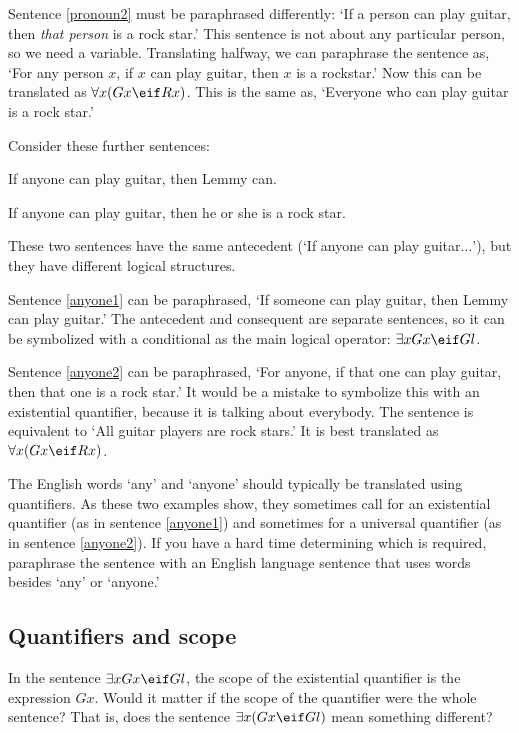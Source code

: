 Sentence \ref{pronoun2} must be paraphrased differently: `If a person can play guitar, then \emph{that person} is a rock star.' This sentence is not about any particular person, so we need a variable. Translating halfway, we can paraphrase the sentence as, `For any person $x$, if $x$ can play guitar, then $x$ is a rockstar.' Now this can be translated as $\forall x (Gx \eif Rx)$. This is the same as, `Everyone who can play guitar is a rock star.'


Consider these further sentences:

\begin{earg}
\item[\ex{anyone1}] If anyone can play guitar, then Lemmy can.
\item[\ex{anyone2}] If anyone can play guitar, then he or she is a rock star.
\end{earg}

These two sentences have the same antecedent (`If anyone can play guitar$\ldots$'), but they have different logical structures.

Sentence \ref{anyone1} can be paraphrased, `If someone can play guitar, then Lemmy can play guitar.' The antecedent and consequent are separate sentences, so it can be symbolized with a conditional as the main logical operator: $\exists x Gx \eif Gl$.

Sentence \ref{anyone2} can be paraphrased, `For anyone, if that one can play guitar, then that one is a rock star.' It would be a mistake to symbolize this with an existential quantifier, because it is talking about everybody. The sentence is equivalent to `All guitar players are rock stars.' It is best translated as $\forall x(Gx \eif Rx)$.

The English words `any' and `anyone' should typically be translated using quantifiers. As these two examples show, they sometimes call for an existential quantifier (as in sentence \ref{anyone1}) and sometimes for a universal quantifier (as in sentence \ref{anyone2}). If you have a hard time determining which is required, paraphrase the sentence with an English language sentence that uses words besides `any' or `anyone.'


\subsection{Quantifiers and scope}

In the sentence $\exists x Gx \eif Gl$, the scope of the existential quantifier is the expression $Gx$. Would it matter if the scope of the quantifier were the whole sentence? That is, does the sentence $\exists x (Gx \eif Gl)$ mean something different?

